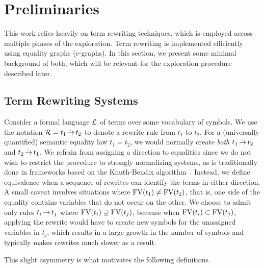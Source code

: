 \section{Preliminaries}
This work relies heavily on term rewriting techniques, which is employed across multiple phases of the exploration.
Term rewriting is implemented efficiently using equality graphs (e-graphs).
In this section, we present some minimal background of both, which will be relevant for the exploration procedure described later.

\subsection{Term Rewriting Systems}
\label{prelim:term-rewriting}

Consider a formal language $\mathcal{L}$ of terms over some vocabulary of symbols.
We use the notation $\mathcal{R} = t_1 \operatorname{\overset{.\,}{\rightarrow}} t_2$ to denote a rewrite rule from $t_1$ to $t_2$.
For a (universally quantified) semantic equality law $t_1 = t_2$, we would normally create \emph{both}
$t_1 \operatorname{\overset{.\,}{\rightarrow}} t_2$ and $t_2 \operatorname{\overset{.\,}{\rightarrow}} t_1$.
We refrain from assigning a direction to equalities since we do not wish to restrict the procedure
to strongly normalizing systems, as is traditionally done in frameworks based on the Knuth-Bendix
algorithm~\cite{knuthbendixcompletion}.
Instead, we define equivalence when a sequence of rewrites can identify the terms in either direction.
A small caveat involves situations where $\mathrm{FV}(t_1)\neq\mathrm{FV}(t_2)$, that is, one side of the equality
contains variables that do not occur on the other.
We choose to admit only rules $t_i \operatorname{\overset{.\,}{\rightarrow}} t_j$ where $\mathrm{FV}(t_i)\supseteq\mathrm{FV}(t_j)$, because when
$\mathrm{FV}(t_i)\subset \mathrm{FV}(t_j)$, applying the rewrite would have to create new symbols for the unassigned
variables in $t_j$, which results in a large growth in the number of symbols and typically makes
rewrites much slower as a result.

\medskip
This slight asymmetry is what motivates the following definitions.

